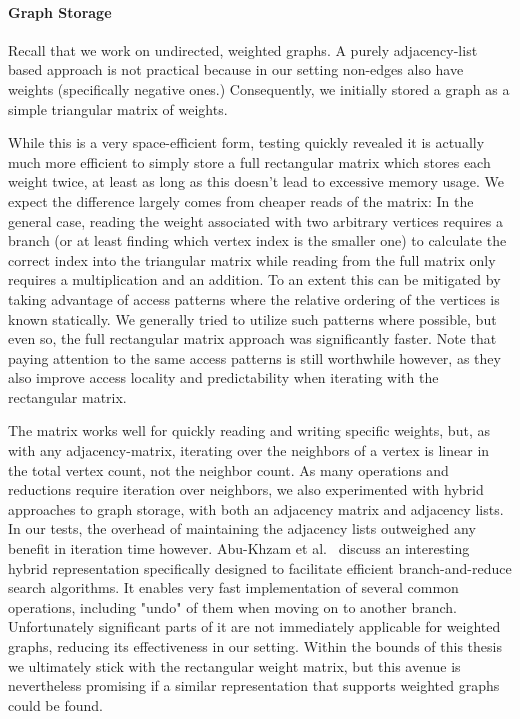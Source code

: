 \documentclass{article}
\theoremstyle{definition}
\begin{document}
\paragraph{Graph Storage} Recall that we work on undirected, weighted graphs. A purely
adjacency-list based approach is not practical because in our setting non-edges also have weights
(specifically negative ones.) Consequently, we initially stored a graph as a simple triangular
matrix of weights.

While this is a very space-efficient form, testing quickly revealed it is actually much more
efficient to simply store a full rectangular matrix which stores each weight twice, at least as long
as this doesn't lead to excessive memory usage. We expect the difference largely comes from cheaper
reads of the matrix: In the general case, reading the weight associated with two arbitrary vertices
requires a branch (or at least finding which vertex index is the smaller one) to calculate the
correct index into the triangular matrix while reading from the full matrix only requires a
multiplication and an addition. To an extent this can be mitigated by taking advantage of access
patterns where the relative ordering of the vertices is known statically. We generally tried to
utilize such patterns where possible, but even so, the full rectangular matrix approach was
significantly faster. Note that paying attention to the same access patterns is still worthwhile
however, as they also improve access locality and predictability when iterating with the rectangular
matrix.

The matrix works well for quickly reading and writing specific weights, but, as with any
adjacency-matrix, iterating over the neighbors of a vertex is linear in the total vertex count, not
the neighbor count. As many operations and reductions require iteration over neighbors, we also
experimented with hybrid approaches to graph storage, with both an adjacency matrix and adjacency
lists. In our tests, the overhead of maintaining the adjacency lists outweighed any benefit in
iteration time however. Abu-Khzam et al.~\cite{AbuKhzam} discuss an interesting hybrid
representation specifically designed to facilitate efficient branch-and-reduce search algorithms. It
enables very fast implementation of several common operations, including "undo" of them when moving
on to another branch. Unfortunately significant parts of it are not immediately applicable for
weighted graphs, reducing its effectiveness in our setting. Within the bounds of this thesis we
ultimately stick with the rectangular weight matrix, but this avenue is nevertheless promising if a
similar representation that supports weighted graphs could be found.
\end{document}
